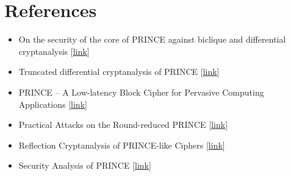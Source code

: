 \documentclass{transcrypto}
\begin{document}
\section{References}
\begin{itemize}
    \item On the security of the core of PRINCE against biclique and differential cryptanalysis [\href{http://eprint.iacr.org/2012/712}{link}]
    \item Truncated differential cryptanalysis of PRINCE [\href{https://onlinelibrary.wiley.com/doi/full/10.1002/sec.1213}{link}]
    \item PRINCE – A Low-latency Block Cipher for Pervasive Computing Applications [\href{https://eprint.iacr.org/2012/529.pdf}{link}]
    \item Practical Attacks on the Round-reduced PRINCE [\href{https://eprint.iacr.org/2015/245.pdf}{link}]
    \item Reflection Cryptanalysis of PRINCE-like Ciphers  [\href{https://www.iacr.org/archive/fse2013/84240065/84240065.pdf}{link}]
    \item Security Analysis of PRINCE [\href{https://eprint.iacr.org/2015/372.pdf}{link}]
    
    
    
\end{itemize}
\end{document}
